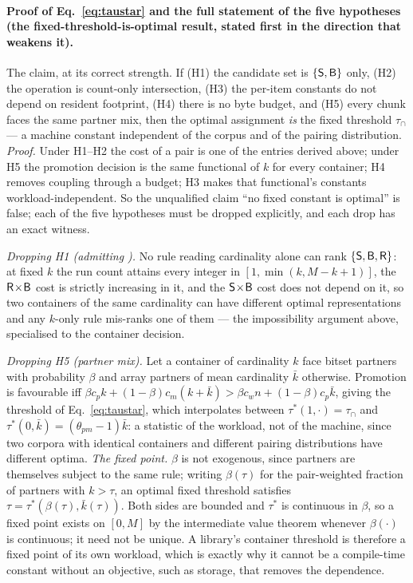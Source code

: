 \paragraph*{Proof of Eq.~\eqref{eq:taustar} and the full statement of the five hypotheses (the
fixed-threshold-is-optimal result, stated first in the direction that weakens it).}
The claim, at its correct strength. If (H1) the candidate set is $\{\textsf{S},\textsf{B}\}$ only, (H2) the
operation is count-only intersection, (H3) the per-item constants do not depend on resident footprint,
(H4) there is no byte budget, and (H5) every chunk faces the same partner mix, then the optimal
assignment \emph{is} the fixed threshold $\tau_\cap$ --- a machine constant independent of the corpus
and of the pairing distribution. \emph{Proof.} Under H1--H2 the cost of a pair is one of the entries
derived above; under H5 the promotion decision is the same functional of $k$ for every container; H4
removes coupling through a budget; H3 makes that functional's constants workload-independent. So the
unqualified claim ``no fixed constant is optimal'' is false; each of the five hypotheses must be
dropped explicitly, and each drop has an exact witness.

\emph{Dropping H1 (admitting \rR).} No rule reading cardinality alone can rank $\{\textsf{S},\textsf{B},\textsf{R}\}$: at
fixed $k$ the run count attains every integer in $[1,\min(k,M-k+1)]$, the $\textsf{R}\!\times\!\textsf{B}$ cost is
strictly increasing in it, and the $\textsf{S}\!\times\!\textsf{B}$ cost does not depend on it, so two containers of
the same cardinality can have different optimal representations and any $k$-only rule mis-ranks one of
them --- the impossibility argument above, specialised to the container decision.

\emph{Dropping H5 (partner mix).} Let a container of cardinality $k$ face bitset partners with
probability $\beta$ and array partners of mean cardinality $\bar k$ otherwise. Promotion is favourable
iff $\beta c_pk+(1-\beta)c_m(k+\bar k)>\beta c_wn+(1-\beta)c_p\bar k$, giving the threshold of
Eq.~\eqref{eq:taustar}, which interpolates between $\tau^*(1,\cdot)=\tau_\cap$ and
$\tau^*(0,\bar k)=(\theta_{pm}-1)\bar k$: a statistic of the workload, not of the machine, since two
corpora with identical containers and different pairing distributions have different optima.
\emph{The fixed point.} $\beta$ is not exogenous, since partners are themselves subject to the same
rule; writing $\beta(\tau)$ for the pair-weighted fraction of partners with $k>\tau$, an optimal fixed
threshold satisfies $\tau=\tau^*(\beta(\tau),\bar k(\tau))$. Both sides are bounded and $\tau^*$ is
continuous in $\beta$, so a fixed point exists on $[0,M]$ by the intermediate value theorem whenever
$\beta(\cdot)$ is continuous; it need not be unique. A library's container threshold is therefore a
fixed point of its own workload, which is exactly why it cannot be a compile-time constant without an
objective, such as storage, that removes the dependence.

